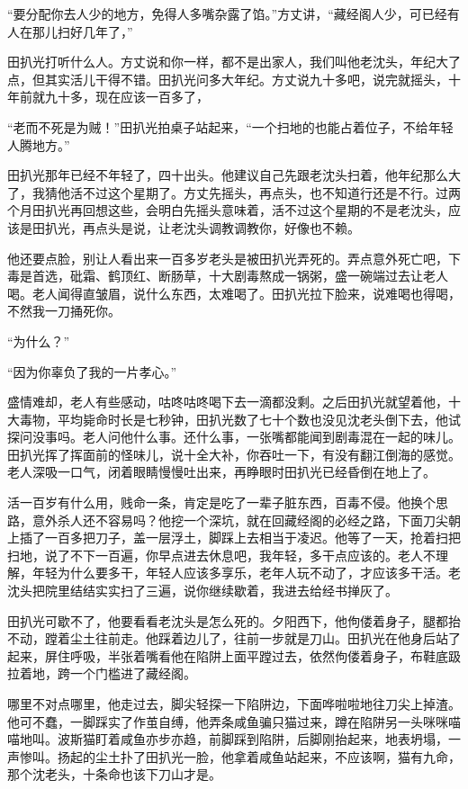 “要分配你去人少的地方，免得人多嘴杂露了馅。”方丈讲，“藏经阁人少，可已经有人在那儿扫好几年了，”

田扒光打听什么人。方丈说和你一样，都不是出家人，我们叫他老沈头，年纪大了点，但其实活儿干得不错。田扒光问多大年纪。方丈说九十多吧，说完就摇头，十年前就九十多，现在应该一百多了，

“老而不死是为贼！”田扒光拍桌子站起来，“一个扫地的也能占着位子，不给年轻人腾地方。”

田扒光那年已经不年轻了，四十出头。他建议自己先跟老沈头扫着，他年纪那么大了，我猜他活不过这个星期了。方丈先摇头，再点头，也不知道行还是不行。过两个月田扒光再回想这些，会明白先摇头意味着，活不过这个星期的不是老沈头，应该是田扒光，再点头是说，让老沈头调教调教你，好像也不赖。

他还要点脸，别让人看出来一百多岁老头是被田扒光弄死的。弄点意外死亡吧，下毒是首选，砒霜、鹤顶红、断肠草，十大剧毒熬成一锅粥，盛一碗端过去让老人喝。老人闻得直皱眉，说什么东西，太难喝了。田扒光拉下脸来，说难喝也得喝，不然我一刀捅死你。

“为什么？”

“因为你辜负了我的一片孝心。”

盛情难却，老人有些感动，咕咚咕咚喝下去一滴都没剩。之后田扒光就望着他，十大毒物，平均毙命时长是七秒钟，田扒光数了七十个数也没见沈老头倒下去，他试探问没事吗。老人问他什么事。还什么事，一张嘴都能闻到剧毒混在一起的味儿。田扒光挥了挥面前的怪味儿，说十全大补，你吞吐一下，有没有翻江倒海的感觉。老人深吸一口气，闭着眼睛慢慢吐出来，再睁眼时田扒光已经昏倒在地上了。

活一百岁有什么用，贱命一条，肯定是吃了一辈子脏东西，百毒不侵。他换个思路，意外杀人还不容易吗？他挖一个深坑，就在回藏经阁的必经之路，下面刀尖朝上插了一百多把刀子，盖一层浮土，脚踩上去相当于凌迟。他等了一天，抢着扫把扫地，说了不下一百遍，你早点进去休息吧，我年轻，多干点应该的。老人不理解，年轻为什么要多干，年轻人应该多享乐，老年人玩不动了，才应该多干活。老沈头把院里结结实实扫了三遍，说你继续歇着，我进去给经书掸灰了。

田扒光可歇不了，他要看看老沈头是怎么死的。夕阳西下，他佝偻着身子，腿都抬不动，蹚着尘土往前走。他踩着边儿了，往前一步就是刀山。田扒光在他身后站了起来，屏住呼吸，半张着嘴看他在陷阱上面平蹚过去，依然佝偻着身子，布鞋底趿拉着地，跨一个门槛进了藏经阁。

哪里不对点哪里，他走过去，脚尖轻探一下陷阱边，下面哗啦啦地往刀尖上掉渣。他可不蠢，一脚踩实了作茧自缚，他弄条咸鱼骗只猫过来，蹲在陷阱另一头咪咪喵喵地叫。波斯猫盯着咸鱼亦步亦趋，前脚踩到陷阱，后脚刚抬起来，地表坍塌，一声惨叫。扬起的尘土扑了田扒光一脸，他拿着咸鱼站起来，不应该啊，猫有九命，那个沈老头，十条命也该下刀山才是。


